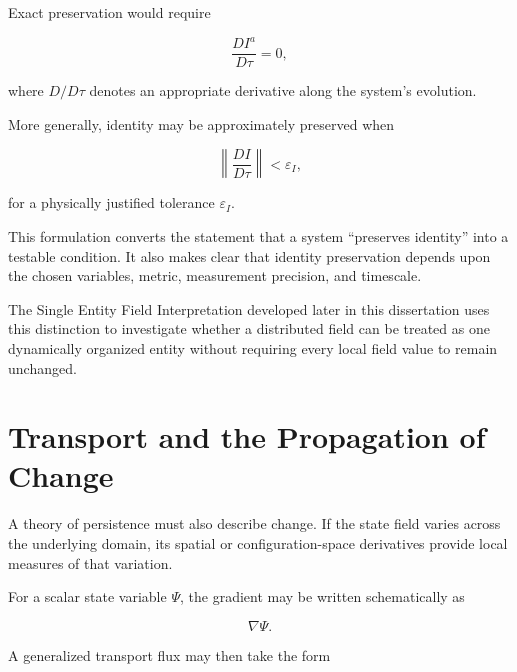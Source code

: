 \documentclass[12pt,oneside]{book}
\begin{document}
Exact preservation would require

\begin{equation}
    \frac{D I^a}{D\tau}
    =
    0,
    \label{eq:exact-identity-preservation}
\end{equation}

where \(D/D\tau\) denotes an appropriate derivative along the
system's evolution.

More generally, identity may be approximately preserved when

\begin{equation}
    \left\|
        \frac{D I}{D\tau}
    \right\|
    <
    \varepsilon_I,
    \label{eq:approximate-identity-preservation}
\end{equation}

for a physically justified tolerance \(\varepsilon_I\).

This formulation converts the statement that a system
``preserves identity'' into a testable condition. It also makes
clear that identity preservation depends upon the chosen
variables, metric, measurement precision, and timescale.

The Single Entity Field Interpretation developed later in this
dissertation uses this distinction to investigate whether a
distributed field can be treated as one dynamically organized
entity without requiring every local field value to remain
unchanged.


\section{Transport and the Propagation of Change}
\label{sec:transport-propagation}

A theory of persistence must also describe change. If the state
field varies across the underlying domain, its spatial or
configuration-space derivatives provide local measures of that
variation.

For a scalar state variable \(\Psi\), the gradient may be
written schematically as

\begin{equation}
    \nabla \Psi.
    \label{eq:state-gradient}
\end{equation}

A generalized transport flux may then take the form
\end{document}
